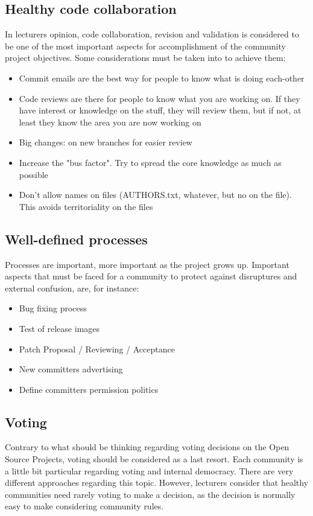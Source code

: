 \documentclass[11pt]{article}
\begin{document}
\subsection{Healthy code collaboration}
In lecturers opinion, code collaboration, revision and validation is considered to be one of the most important aspects for accomplishment of the community project objectives. Some considerations must be taken into to achieve them:
\begin{itemize}\itemsep0pt
\item{Commit emails are the best way for people to know what is doing each-other}
\item{Code reviews are there for people to know what you are working on. If they have interest or knowledge on the stuff, they will review them, but if not, at least they know the area you are now working on}
\item{Big changes: on new branches for easier review}
\item{Increase the "bus factor". Try to spread the core knowledge as much as possible}
\item{Don't allow names on files (AUTHORS.txt, whatever, but no on the file). This avoids territoriality on the files}
\end{itemize}

\subsection{Well-defined processes}
Processes are important, more important as the project grows up. Important aspects that must be faced for a community to protect against disruptures and external confusion, are, for instance:
\begin{itemize}\itemsep0pt
\item{Bug fixing process}
\item{Test of release images}
\item{Patch Proposal / Reviewing / Acceptance}
\item{New committers advertising}
\item{Define committers permission politics}
\end{itemize}

\subsection{Voting}
Contrary to what should be thinking regarding voting decisions on the Open Source Projects, voting should be considered as a last resort.
Each community is a little bit particular regarding voting and internal democracy. There are very different approaches regarding this topic. However, lecturers consider that healthy communities need rarely voting to make a decision, as the decision is normally easy to make considering community rules.
\end{document}
